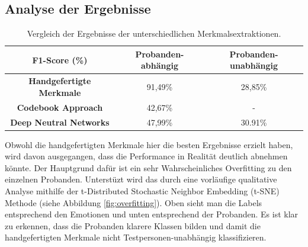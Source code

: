 \subsection{Analyse der Ergebnisse} \label{analyse-subsec}


\begin{table}[H] \centering
\begin{tabular}{|c|c|c|}
\hline
\textbf{F1-Score (\%)} & \textbf{Probanden-abhängig} & \textbf{Probanden-unabhängig} \\ \hline
\textbf{Handgefertigte Merkmale} & 91,49\% & 28,85\% \\ \hline
\textbf{Codebook Approach} & 42,67\% & - \\ \hline
\textbf{Deep Neutral Networks} & 47,99\% & 30.91\% \\ \hline
\end{tabular} \vspace{0.2cm} \label{tab-res-1} \caption{Vergleich der Ergebnisse der unterschiedlichen Merkmalsextraktionen.}
\end{table}





Obwohl die handgefertigten Merkmale hier die besten Ergebnisse erzielt haben, wird davon ausgegangen, dass die Performance in Realität deutlich abnehmen könnte.
Der Hauptgrund dafür ist ein sehr Wahrscheinliches Overfitting zu den einzelnen Probanden. 
Unterstüzt wird das durch eine vorläufige qualitative Analyse mithilfe der t-Distributed Stochastic Neighbor Embedding (t-SNE) Methode (siehe Abbildung \ref{fig:overfitting}). 
Oben sieht man die Labels entsprechend den Emotionen und unten entsprechend der Probanden.
Es ist klar zu erkennen, dass die Probanden klarere Klassen bilden und damit die handgefertigten Merkmale nicht Testpersonen-unabhängig klassifizieren. \\


